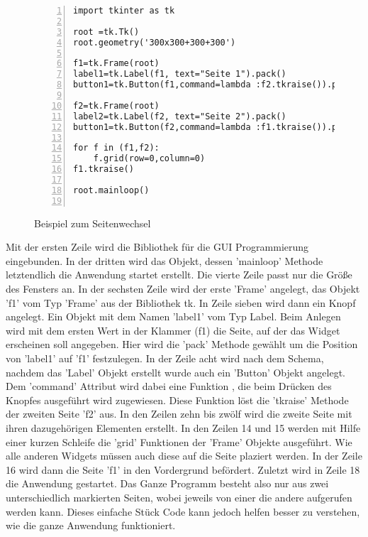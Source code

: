 \documentclass[11pt]{scrartcl}
\begin{document}
\begin{onehalfspace}
\begin{figure}[H]
\begin{lstlisting}[basicstyle=\small,numbers=left, stepnumber=1]
import tkinter as tk

root =tk.Tk()
root.geometry('300x300+300+300')

f1=tk.Frame(root)
label1=tk.Label(f1, text="Seite 1").pack()
button1=tk.Button(f1,command=lambda :f2.tkraise()).pack()

f2=tk.Frame(root)
label2=tk.Label(f2, text="Seite 2").pack()
button1=tk.Button(f2,command=lambda :f1.tkraise()).pack()

for f in (f1,f2):
    f.grid(row=0,column=0)
f1.tkraise()

root.mainloop()
	
\end{lstlisting}
\caption{Beispiel zum Seitenwechsel}
\label{code:tkraise}
\end{figure}

Mit der ersten Zeile wird die Bibliothek für die GUI Programmierung eingebunden. In der dritten wird das Objekt, dessen 'mainloop' Methode letztendlich die Anwendung startet erstellt. Die vierte Zeile passt nur die Größe des Fensters an. In der sechsten Zeile wird der erste 'Frame' angelegt, das Objekt 'f1' vom Typ 'Frame' aus der Bibliothek tk. In Zeile sieben wird dann ein Knopf angelegt. Ein Objekt mit dem Namen 'label1' vom Typ Label. Beim Anlegen wird mit dem ersten Wert in der Klammer (f1) die Seite, auf der das Widget erscheinen soll angegeben. Hier wird die 'pack' Methode gewählt um die Position von 'label1' auf 'f1' festzulegen.
In der Zeile acht wird nach dem Schema, nachdem das 'Label' Objekt erstellt wurde auch ein 'Button' Objekt angelegt. Dem 'command' Attribut wird dabei eine Funktion , die beim Drücken des Knopfes ausgeführt wird zugewiesen. Diese Funktion löst die 'tkraise' Methode der zweiten Seite 'f2' aus. In den Zeilen zehn bis zwölf wird die zweite Seite mit ihren dazugehörigen Elementen erstellt. In den Zeilen 14 und 15 werden mit Hilfe einer kurzen Schleife die 'grid' Funktionen der 'Frame' Objekte ausgeführt. Wie alle anderen Widgets müssen auch diese auf die Seite plaziert werden. In der Zeile 16 wird dann die Seite 'f1' in den Vordergrund befördert. Zuletzt wird in Zeile 18 die Anwendung gestartet. Das Ganze Programm besteht also nur aus zwei unterschiedlich markierten Seiten, wobei jeweils von einer die andere aufgerufen werden kann. Dieses einfache Stück Code kann jedoch helfen besser zu verstehen, wie die ganze Anwendung funktioniert.


\end{onehalfspace}
\end{document}

